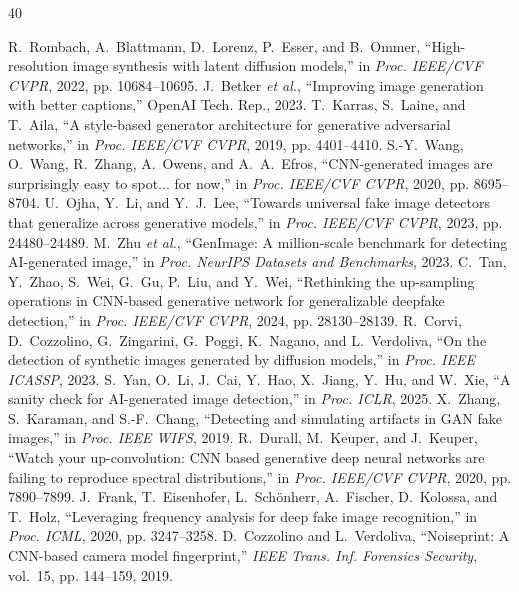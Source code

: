\documentclass[journal]{IEEEtran}
\begin{document}
\begin{thebibliography}{40}

 R.~Rombach, A.~Blattmann, D.~Lorenz, P.~Esser, and B.~Ommer, ``High-resolution image synthesis with latent diffusion models,'' in \textit{Proc. IEEE/CVF CVPR}, 2022, pp. 10684--10695.
 J.~Betker \textit{et al.}, ``Improving image generation with better captions,'' OpenAI Tech. Rep., 2023.
 T.~Karras, S.~Laine, and T.~Aila, ``A style-based generator architecture for generative adversarial networks,'' in \textit{Proc. IEEE/CVF CVPR}, 2019, pp. 4401--4410.
 S.-Y.~Wang, O.~Wang, R.~Zhang, A.~Owens, and A.~A.~Efros, ``CNN-generated images are surprisingly easy to spot... for now,'' in \textit{Proc. IEEE/CVF CVPR}, 2020, pp. 8695--8704.
 U.~Ojha, Y.~Li, and Y.~J.~Lee, ``Towards universal fake image detectors that generalize across generative models,'' in \textit{Proc. IEEE/CVF CVPR}, 2023, pp. 24480--24489.
 M.~Zhu \textit{et al.}, ``GenImage: A million-scale benchmark for detecting AI-generated image,'' in \textit{Proc. NeurIPS Datasets and Benchmarks}, 2023.
 C.~Tan, Y.~Zhao, S.~Wei, G.~Gu, P.~Liu, and Y.~Wei, ``Rethinking the up-sampling operations in CNN-based generative network for generalizable deepfake detection,'' in \textit{Proc. IEEE/CVF CVPR}, 2024, pp. 28130--28139.
 R.~Corvi, D.~Cozzolino, G.~Zingarini, G.~Poggi, K.~Nagano, and L.~Verdoliva, ``On the detection of synthetic images generated by diffusion models,'' in \textit{Proc. IEEE ICASSP}, 2023.
 S.~Yan, O.~Li, J.~Cai, Y.~Hao, X.~Jiang, Y.~Hu, and W.~Xie, ``A sanity check for AI-generated image detection,'' in \textit{Proc. ICLR}, 2025.
 X.~Zhang, S.~Karaman, and S.-F.~Chang, ``Detecting and simulating artifacts in GAN fake images,'' in \textit{Proc. IEEE WIFS}, 2019.
 R.~Durall, M.~Keuper, and J.~Keuper, ``Watch your up-convolution: CNN based generative deep neural networks are failing to reproduce spectral distributions,'' in \textit{Proc. IEEE/CVF CVPR}, 2020, pp. 7890--7899.
 J.~Frank, T.~Eisenhofer, L.~Sch\"onherr, A.~Fischer, D.~Kolossa, and T.~Holz, ``Leveraging frequency analysis for deep fake image recognition,'' in \textit{Proc. ICML}, 2020, pp. 3247--3258.
 D.~Cozzolino and L.~Verdoliva, ``Noiseprint: A CNN-based camera model fingerprint,'' \textit{IEEE Trans. Inf. Forensics Security}, vol.~15, pp. 144--159, 2019.

\end{thebibliography}
\end{document}

